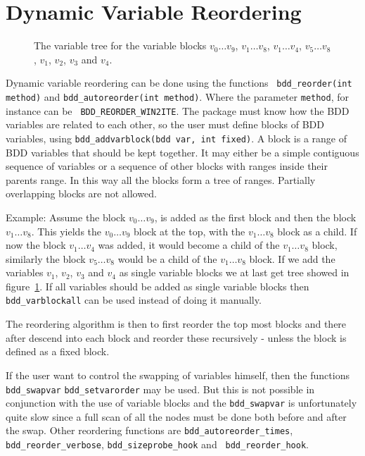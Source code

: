\documentclass[a4paper,11pt,twoside,fleqn,openright]{report}
\begin{document}
\section{Dynamic Variable Reordering} 
 

\begin{figure}
  \begin{center}
    
    \caption{The variable tree for the variable blocks $v_0\ldots v_9$,
      $v_1\ldots v_8$, $v_1\ldots v_4$, $v_5\ldots v_8$, $v_1$, $v_2$,
      $v_3$ and $v_4$.}
    \label{fig:vartree}
  \end{center}
\end{figure}

Dynamic variable reordering can be done using the functions {\tt
  bdd\_reorder(int method)} and {\tt bdd\_autoreorder(int method)}.
Where the parameter {\tt method}, for instance can be {\tt
  BDD\_REORDER\_WIN2ITE}.  The package must know how the BDD variables
are related to each other, so the user must define blocks of BDD
variables, using {\tt bdd\_addvarblock(bdd var, int fixed)}. A block
is a range of BDD variables that should be kept together. It may
either be a simple contiguous sequence of variables or a sequence of
other blocks with ranges inside their parents range. In this way all
the blocks form a tree of ranges. Partially overlapping blocks are not
allowed.

Example: Assume the block $v_0\ldots v_9$, is added as the first block
and then the block $v_1\ldots v_8$. This yields the $v_0\ldots v_9$
block at the top, with the $v_1\ldots v_8$ block as a child. If now
the block $v_1\ldots v_4$ was added, it would become a child of the
$v_1\ldots v_8$ block, similarly the block $v_5\ldots v_8$ would be a
child of the $v_1\ldots v_8$ block. If we add the variables $v_1$,
$v_2$, $v_3$ and $v_4$ as single variable blocks we at last get tree
showed in figure~\ref{fig:vartree}. If all variables should be added
as single variable blocks then {\tt bdd\_varblockall} can be used
instead of doing it manually.

The reordering algorithm is then to first reorder the top most blocks
and there after descend into each block and reorder these recursively
- unless the block is defined as a fixed block.

If the user want to control the swapping of variables himself, then
the functions {\tt bdd\_swapvar} {\tt bdd\_setvarorder} may be used.
But this is not possible in conjunction with the use of variable
blocks and the {\tt bdd\_swapvar} is unfortunately quite slow since a
full scan of all the nodes must be done both before and after the
swap. Other reordering functions are {\tt bdd\_autoreorder\_times},
{\tt bdd\_reorder\_verbose}, {\tt bdd\_sizeprobe\_hook} and {\tt
  bdd\_reorder\_hook}.
\end{document}
